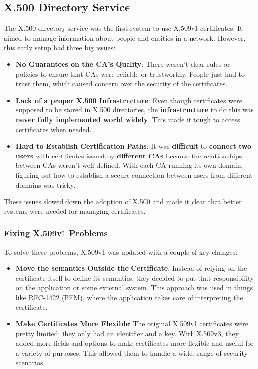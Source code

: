 \subsection{X.500 Directory Service}

The X.500 directory service was the first system to use X.509v1
certificates. It aimed to manage information about people and entities
in a network. However, this early setup had three big issues:

\begin{itemize}
  \item \textbf{No Guarantees on the CA's Quality}: There weren't
    clear rules or policies to ensure that CAs were reliable or
    trustworthy. People just had to trust them, which caused concern
    over the security of the certificates.

  \item \textbf{Lack of a proper X.500 Infrastructure}: Even though
    certificates were supposed to be stored in X.500 directories, the
    \textbf{infrastructure} to do this was \textbf{never fully
    implemented world widely}. This made it tough to access
    certificates when needed.

  \item \textbf{Hard to Establish Certification Paths}: It was
    \textbf{difficult} to \textbf{connect two users} with certificates
    issued by \textbf{different CAs} because the relationships between
    CAs weren’t well-defined. With each CA running its own domain,
    figuring out how to establish a secure connection between users
    from different domains was tricky.
\end{itemize}

These issues slowed down the adoption of X.500 and made it clear that
better systems were needed for managing certificates.

\subsubsection{Fixing X.509v1 Problems}

To solve these problems, X.509v1 was updated with a couple of key
changes:

\begin{itemize}
  \item \textbf{Move the semantics Outside the Certificate}: Instead of
    relying on the certificate itself to define its semantics, they
    decided to put that responsibility on the application or some
    external system. This approach was used in things like RFC-1422
    (PEM), where the application takes care of interpreting the
    certificate.

  \item \textbf{Make Certificates More Flexible}: The original X.509v1
    certificates were pretty limited: they only had an identifier and a
    key. With X.509v3, they added more fields and options to make
    certificates more flexible and useful for a variety of purposes.
    This allowed them to handle a wider range of security scenarios.
\end{itemize}

